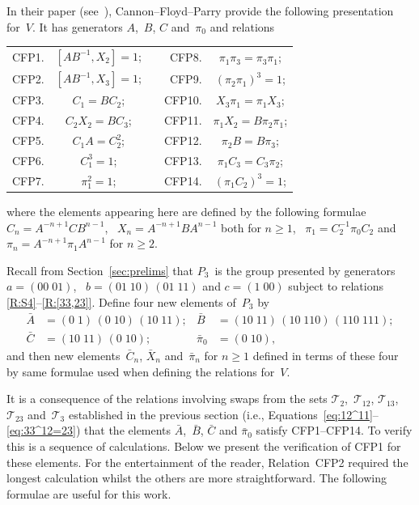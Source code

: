 \documentclass[a4paper,11pt]{article}
\numberwithin{equation}{section}
\newcommand{\swap}[2]{(#1\;#2)}
\newcommand{\Sw}[1]{\mathcal{T}_{#1}}
\renewcommand{\geq}{\geqslant}
\renewcommand{\theenumi}{(\roman{enumi})}
\begin{document}
In their paper (see~\cite[Lemma~6.1]{CFP}), Cannon--Floyd--Parry
provide the following presentation for~$V$.  It has generators
$A$,~$B$, $C$ and~$\pi_{0}$ and relations
\begin{center}
  \renewcommand{\theenumi}{CFP\arabic{enumi}}
  \begin{tabular}{rccrc}
    CFP1. & $[AB^{-1}, X_{2}] = 1$; &\qquad\qquad
    &CFP8. & $\pi_{1} \pi_{3} = \pi_{3} \pi_{1}$; \\
    CFP2. & $[AB^{-1}, X_{3}] = 1$; &
    &CFP9. & $(\pi_{2} \pi_{1})^{3} = 1$; \\
    CFP3. & $C_{1} = BC_{2}$; &
    &CFP10. & $X_{3} \pi_{1} = \pi_{1} X_{3}$; \\
    CFP4. & $C_{2}X_{2} = BC_{3}$; &
    &CFP11. & $\pi_{1} X_{2} = B \pi_{2} \pi_{1}$; \\
    CFP5. & $C_{1}A = C_{2}^{2}$; &
    &CFP12. & $\pi_{2} B = B \pi_{3}$; \\
    CFP6. & $C_{1}^{3} = 1$; &
    &CFP13. & $\pi_{1} C_{3} = C_{3} \pi_{2}$; \\
    CFP7. & $\pi_{1}^{2} = 1$; &
    &CFP14. & $(\pi_{1} C_{2})^{3} = 1$;
  \end{tabular}
\end{center}
where the elements appearing here are defined by the following
formulae $C_{n} = A^{-n+1} C B^{n-1}$, \ $X_{n} = A^{-n+1} B A^{n-1}$
both for $n \geq 1$, \ $\pi_{1} = C_{2}^{-1} \pi_{0} C_{2}$ and
$\pi_{n} = A^{-n+1} \pi_{1} A^{n-1}$ for $n \geq 2$.

Recall from Section~\ref{sec:prelims} that $P_{3}$~is the group
presented by generators $a = \swap{00}{01}$, \ $b = \swap{01}{10} \,
\swap{01}{11}$ and $c = \swap{1}{00}$ subject to relations
\ref{R:S4}--\ref{R:[33,23]}.  Define four new elements of~$P_{3}$ by
\begin{align*}
  \bar{A} &= \swap{0}{1} \, \swap{0}{10} \, \swap{10}{11};
  &\bar{B} &= \swap{10}{11} \, \swap{10}{110} \, \swap{110}{111}; \\
  \bar{C} &= \swap{10}{11} \, \swap{0}{10};
  &\bar{\pi}_{0} &= \swap{0}{10},
\end{align*}
and then new elements~$\bar{C}_{n}$, $\bar{X}_{n}$ and~$\bar{\pi}_{n}$
for $n \geq 1$ defined in terms of these four by same formulae used
when defining the relations for~$V$.

It is a consequence of the relations involving swaps from the sets
$\Sw{2}$,~$\Sw{12}$, $\Sw{13}$, $\Sw{23}$ and~$\Sw{3}$ established in
the previous section (i.e.,
Equations~\eqref{eq:12^11}--\eqref{eq:33^12=23}) that the elements
$\bar{A}$,~$\bar{B}$, $\bar{C}$ and $\bar{\pi}_{0}$ satisfy
CFP1--CFP14\@.  To verify this is a sequence of calculations.  Below
we present the verification of CFP1 for these elements.  For the
entertainment of the reader, Relation~CFP2 required the longest
calculation whilst the others are more straightforward.  The following
formulae are useful for this work.
\end{document}
